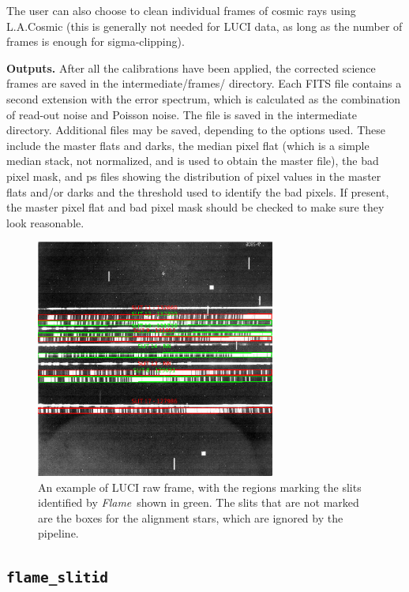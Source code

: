 \documentclass[a4paper]{article}
\newcommand{\flame}{\emph{Flame}}
\begin{document}
\begin{sloppypar}
The user can also choose to clean individual frames of cosmic rays using L.A.Cosmic (this is generally not needed for LUCI data, as long as the number of frames is enough for sigma-clipping).

\medskip
\noindent
\textbf{Outputs.} After all the calibrations have been applied, the corrected science frames are saved in the intermediate/frames/ directory. Each FITS file contains a second extension with the error spectrum, which is calculated as the combination of read-out noise and Poisson noise. The  file is saved in the intermediate directory. Additional files may be saved, depending to the options used. These include the master flats and darks, the median pixel flat (which is a simple median stack, not normalized, and is used to obtain the master file), the bad pixel mask, and ps files showing the distribution of pixel values in the master flats and/or darks and the threshold used to identify the bad pixels. If present, the master pixel flat and bad pixel mask should be checked to make sure they look reasonable.


\begin{figure}[htbp]
\centering
\includegraphics[width=0.7\textwidth]{slits}
\caption{An example of LUCI raw frame, with the regions marking the slits identified by \flame\ shown in green. The slits that are not marked are the boxes for the alignment stars, which are ignored by the pipeline.}
\label{fig:slits}
\end{figure}

\subsection{\texttt{flame\_slitid}}
\label{sec:slitid}


\end{sloppypar}
\end{document}
